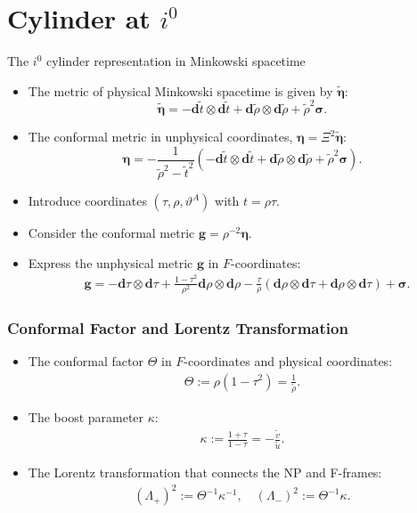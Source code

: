 \documentclass{beamer}
\theoremstyle{remark}
\theoremstyle{plain}
\theoremstyle{plain}
\begin{document}
\section{Cylinder at $i^0$}
\begin{frame}{The $i^0$ cylinder representation in Minkowski  spacetime}
  \begin{itemize}
    \item The metric of physical Minkowski spacetime is given by $\tilde{\boldsymbol{\eta}}$:
    \begin{equation}
      \tilde{\boldsymbol{\eta}}=-\mathbf{d} \tilde{t} \otimes \mathbf{d} \tilde{t}+\mathbf{d} \tilde{\rho} \otimes \mathbf{d} \tilde{\rho}+\tilde{\rho}^2 \boldsymbol{\sigma}.
    \end{equation}
    \item The conformal metric in unphysical coordinates, $\boldsymbol{\eta} = \Xi^2 \boldsymbol{\tilde{\eta}}$: 
    \begin{equation}
      \boldsymbol{\eta} = -\frac{1}{\tilde{\rho}^2 - \tilde{t}^2} (-\mathbf{d} \tilde{t} \otimes \mathbf{d} \tilde{t} + \mathbf{d} \tilde{\rho} \otimes \mathbf{d} \tilde{\rho} + \tilde{\rho}^2 \boldsymbol{\sigma}).
    \end{equation}
    \item Introduce coordinates $(\tau, \rho, \vartheta^A)$ with $t = \rho \tau$.
    \item Consider the conformal metric $\boldsymbol{g} = \rho^{-2} \boldsymbol{\eta}$.
    \item Express the unphysical metric $\boldsymbol{g}$ in $F$-coordinates:
    \begin{align}
      & \boldsymbol{g} = -\mathbf{d} \tau \otimes \mathbf{d} \tau + \frac{1 - \tau^2}{\rho^2} \mathbf{d} \rho \otimes \mathbf{d} \rho - \frac{\tau}{\rho} \left(\mathbf{d} \rho \otimes \mathbf{d} \tau + \mathbf{d} \rho \otimes \mathbf{d} \tau\right) + \boldsymbol{\sigma}.
    \end{align}
  \end{itemize}
\end{frame}

\begin{frame}
  \frametitle{Conformal Factor and Lorentz Transformation}
  \begin{itemize}
    \item The conformal factor $\Theta$ in $F$-coordinates and physical coordinates:
    \begin{align}
      \Theta := \rho (1-\tau^2) = \frac{1}{\tilde{\rho}}.
    \end{align}
    \item The boost parameter $\kappa$:
    \begin{align}
      \kappa := \frac{1+\tau}{1-\tau} = -\frac{\tilde{v}}{\tilde{u}}.
    \end{align}
    \item The Lorentz transformation that connects the NP and F-frames:
    \begin{align}
      (\Lambda_{+})^{2} := \Theta^{-1}\kappa^{-1}, \quad (\Lambda_{-})^{2} := \Theta^{-1}\kappa.
    \end{align}
  \end{itemize}
\end{frame}
\end{document}
